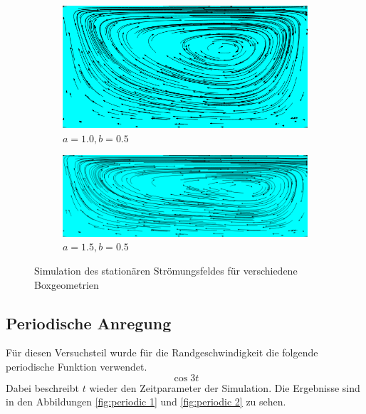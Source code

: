 		\begin{figure}[!hptb]
			\begin{subfigure}[b]{.5\textwidth}
				\center
				\includegraphics[scale = 0.32]{screenshots/box-10-05.png}
				\caption{$a=1.0, b=0.5$}
			\end{subfigure}

			\begin{subfigure}[b]{.5\textwidth}
				\center
				\includegraphics[scale = 0.32]{screenshots/box-15-05.png}
				\caption{$a=1.5, b=0.5$}
			\end{subfigure}
			\caption{Simulation des stationären Strömungsfeldes für verschiedene Boxgeometrien}
			\label{fig:box 2}
		\end{figure}



	\subsection{Periodische Anregung} %
	\label{sub:periodische_anregung}

		Für diesen Versuchsteil wurde für die Randgeschwindigkeit die folgende periodische Funktion verwendet.
		\[ \cos 3t \]
		Dabei beschreibt $t$ wieder den Zeitparameter der Simulation.
		Die Ergebnisse sind in den Abbildungen \ref{fig:periodic 1} und \ref{fig:periodic 2} zu sehen.
	

